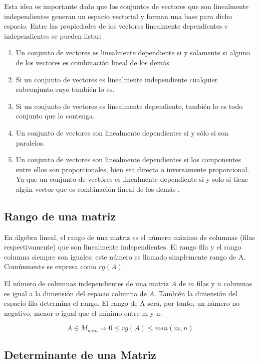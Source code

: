 Esta idea es importante dado que los conjuntos de vectores que son linealmente independientes generan un espacio vectorial y 
forman una base para dicho espacio. Entre las propiedades de los vectores linealmente dependientes e independientes se pueden 
listar:
\begin{enumerate}
   \item Un conjunto de vectores es linealmente dependiente si y solamente si alguno de los vectores es combinación lineal de 
        los demás.
    \item Si un conjunto de vectores es linealmente independiente cualquier subconjunto suyo también lo es.
    \item Si un conjunto de vectores es linealmente dependiente, también lo es todo conjunto que lo contenga.
    \item Un conjunto de vectores son linealmente dependientes si y sólo si son paralelos.
    \item Un conjunto de vectores son linealmente dependientes si los componentes entre ellos son proporcionales, bien sea 
        directa o inversamente proporcional. Ya que un conjunto de vectores es linealmente dependiente si y solo si tiene algún
        vector que es combinación lineal de los demás \cite{MatrixDep}.
\end{enumerate}

\subsection{Rango de una matriz}

En álgebra lineal, el rango de una matriz es el número máximo de columnas (filas respectivamente) que son linealmente 
independientes. El rango fila y el rango columna siempre son iguales: este número es llamado simplemente rango de A.
Comúnmente se expresa como $rg(A)$ \cite{MatrixRg}.

El número de columnas independientes de una matriz $A$ de $m$ filas y $n$ columnas es igual a la dimensión del espacio columna
de $A$. También la dimensión del espacio fila determina el rango. El rango de A será, por tanto, un número no negativo, menor
o igual que el mínimo entre m y n:

\begin{equation}
    A \in M_{mxn} \Rightarrow 0 \le rg(A) \le min(m, n)
\end{equation}

\subsection{Determinante de una Matriz}

